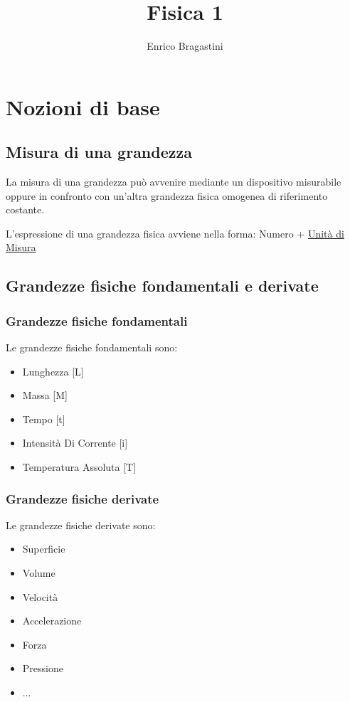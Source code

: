 \documentclass[12pt,oneside]{book}
\title{\Large{\textbf{Fisica 1}}}
\author{Enrico Bragastini}
\begin{document}
\pagestyle{fancy}
\fancyhf{}
\lhead{\nouppercase\leftmark}
\cfoot{\thepage}
\frontmatter

\maketitle
\tableofcontents

\mainmatter
\chapter{Nozioni di base}
\section{Misura di una grandezza}
La misura di una grandezza può avvenire mediante un dispositivo misurabile
oppure in confronto con un'altra grandezza fisica omogenea di riferimento costante.

L'espressione di una grandezza fisica avviene nella forma: Numero + \underline{Unità di Misura}

\section{Grandezze fisiche fondamentali e derivate}
\subsection{Grandezze fisiche fondamentali}
Le grandezze fisiche fondamentali sono:
\begin{itemize}
    \item Lunghezza                 \tabto{8cm} [L]
    \item Massa                     \tabto{8cm}  [M]
    \item Tempo                     \tabto{8cm}  [t]
    \item Intensità Di Corrente     \tabto{8cm}  [i]
    \item Temperatura Assoluta      \tabto{8cm}  [T]
\end{itemize}

\subsection{Grandezze fisiche derivate}
Le grandezze fisiche derivate sono:
\begin{itemize}
    \item Superficie
    \item Volume
    \item Velocità
    \item Accelerazione
    \item Forza
    \item Pressione
    \item ...
\end{itemize}
\end{document}
